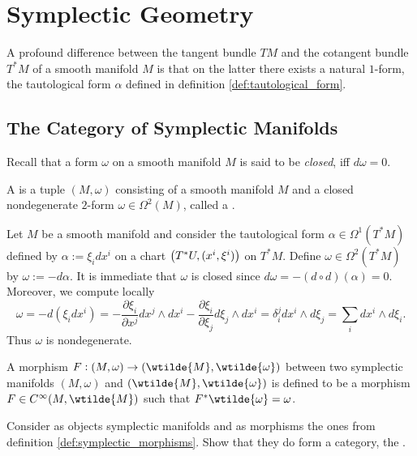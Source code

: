 \section*{Symplectic Geometry}
A profound difference between the tangent bundle $TM$ and the cotangent bundle $T^*M$ of a smooth manifold $M$ is that on the latter there exists a natural $1$-form, the tautological form $\alpha$ defined in definition \ref{def:tautological_form}.  

\subsection*{The Category of Symplectic Manifolds}
Recall that a form $\omega$ on a smooth manifold $M$ is said to be \emph{closed}, iff $d\omega = 0$.

\begin{definition}
	A  is a tuple $(M,\omega)$ consisting of a smooth manifold $M$ and a closed nondegenerate $2$-form $\omega \in \Omega^2(M)$, called a .
\end{definition}

\begin{example}
	Let $M$ be a smooth manifold and consider the tautological form $\alpha \in \Omega^1(T^*M)$ defined by $\alpha := \xi_i dx^i$ on a chart $\del[1]{T^*U, (x^i,\xi^i)}$ on $T^*M$. Define $\omega \in \Omega^2(T^*M)$ by $\omega := -d\alpha$. It is immediate that $\omega$ is closed since $d\omega = -(d \circ d)(\alpha) = 0$. Moreover, we compute locally
	\begin{equation*}
		\omega = -d(\xi_idx^i) = -\frac{\partial \xi_i}{\partial x^j} dx^j \wedge dx^i - \frac{\partial \xi_i}{\partial \xi_j} d\xi_j \wedge dx^i = \delta^j_i dx^i \wedge d\xi_j = \sum_i dx^i \wedge d\xi_i.
	\end{equation*}
	Thus $\omega$ is nondegenerate. 
\end{example}

\begin{definition}
	\label{def:symplectic_morphisms}
	A morphism $F : (M,\omega) \to (\wtilde{M},\wtilde{\omega})$ between two symplectic manifolds $(M,\omega)$ and $(\wtilde{M},\wtilde{\omega})$ is defined to be a morphism $F \in C^\infty(M,\wtilde{M})$ such that $F^*\wtilde{\omega} = \omega$. 
\end{definition}

\begin{exercise}
	Consider as objects symplectic manifolds and as morphisms the ones from definition \ref{def:symplectic_morphisms}. Show that they do form a category, the .
\end{exercise}

